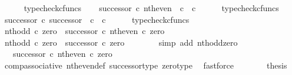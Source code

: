 \begin{isabellebody}
\ \ \ \ \isamarkupfalse%
\ typecheck{\isacharunderscore}{\kern0pt}cfuncs\isanewline
\ \ \isamarkupfalse%
\ {\isachardoublequoteopen}successor\ {\isasymcirc}\isactrlsub c\ nth{\isacharunderscore}{\kern0pt}even\ {\isacharcolon}{\kern0pt}\ {\isasymnat}\isactrlsub c\ {\isasymrightarrow}\ {\isasymnat}\isactrlsub c{\isachardoublequoteclose}\isanewline
\ \ \ \ \isamarkupfalse%
\ typecheck{\isacharunderscore}{\kern0pt}cfuncs\isanewline
\ \ \isamarkupfalse%
\ {\isachardoublequoteopen}successor\ {\isasymcirc}\isactrlsub c\ successor\ {\isacharcolon}{\kern0pt}\ {\isasymnat}\isactrlsub c\ {\isasymrightarrow}\ {\isasymnat}\isactrlsub c{\isachardoublequoteclose}\isanewline
\ \ \ \ \isamarkupfalse%
\ typecheck{\isacharunderscore}{\kern0pt}cfuncs\isanewline
\ \ \isamarkupfalse%
\ {\isachardoublequoteopen}nth{\isacharunderscore}{\kern0pt}odd\ {\isasymcirc}\isactrlsub c\ zero\ {\isacharequal}{\kern0pt}\ {\isacharparenleft}{\kern0pt}successor\ {\isasymcirc}\isactrlsub c\ nth{\isacharunderscore}{\kern0pt}even{\isacharparenright}{\kern0pt}\ {\isasymcirc}\isactrlsub c\ zero{\isachardoublequoteclose}\isanewline
\ \ \isamarkupfalse%
\ {\isacharminus}{\kern0pt}\isanewline
\ \ \ \ \isamarkupfalse%
\ {\isachardoublequoteopen}nth{\isacharunderscore}{\kern0pt}odd\ {\isasymcirc}\isactrlsub c\ zero\ {\isacharequal}{\kern0pt}\ successor\ {\isasymcirc}\isactrlsub c\ zero{\isachardoublequoteclose}\isanewline
\ \ \ \ \ \ \isamarkupfalse%
\ {\isacharparenleft}{\kern0pt}simp\ add{\isacharcolon}{\kern0pt}\ nth{\isacharunderscore}{\kern0pt}odd{\isacharunderscore}{\kern0pt}zero{\isacharparenright}{\kern0pt}\isanewline
\ \ \ \ \isamarkupfalse%
\ \isamarkupfalse%
\ {\isachardoublequoteopen}{\isachardot}{\kern0pt}{\isachardot}{\kern0pt}{\isachardot}{\kern0pt}\ {\isacharequal}{\kern0pt}\ {\isacharparenleft}{\kern0pt}successor\ {\isasymcirc}\isactrlsub c\ nth{\isacharunderscore}{\kern0pt}even{\isacharparenright}{\kern0pt}\ {\isasymcirc}\isactrlsub c\ zero{\isachardoublequoteclose}\isanewline
\ \ \ \ \ \ \isamarkupfalse%
\ comp{\isacharunderscore}{\kern0pt}associative{}\ nth{\isacharunderscore}{\kern0pt}even{\isacharunderscore}{\kern0pt}def{}\ successor{\isacharunderscore}{\kern0pt}type\ zero{\isacharunderscore}{\kern0pt}type\ \isamarkupfalse%
\ fastforce\isanewline
\ \ \ \ \isamarkupfalse%
\ \isamarkupfalse%
\ {\isacharquery}{\kern0pt}thesis\isanewline

\end{isabellebody}
